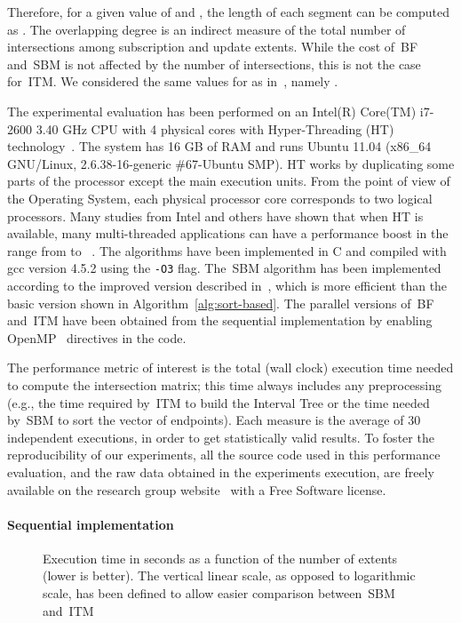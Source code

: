 \documentclass[10pt, conference, compsocconf]{IEEEtran}
\begin{document}
Therefore, for a given value of  and , the length  of
each segment can be computed as . The overlapping
degree is an indirect measure of the total number of intersections
among subscription and update extents. While the cost of~\ac{BF}
and~\ac{SBM} is not affected by the number of intersections, this is not
the case for~\ac{ITM}. We considered the same values for  as
in~\cite{Raczy2005}, namely .

The experimental evaluation has been performed on an Intel(R) Core(TM)
i7-2600 \@ 3.40 GHz CPU with 4 physical cores with Hyper-Threading
(HT) technology~\cite{HT}. The system has 16 GB of RAM and runs Ubuntu
11.04 (x86\_64 GNU/Linux, 2.6.38-16-generic \#67-Ubuntu SMP). HT works
by duplicating some parts of the processor except the main execution
units. From the point of view of the Operating System, each physical
processor core corresponds to two logical processors. Many studies
from Intel and others have shown that when HT is available, many
multi-threaded applications can have a performance boost in the range
from  to ~\cite{HT}.  The algorithms have been implemented
in C and compiled with gcc version 4.5.2 using the \verb+-O3+
flag. The~\ac{SBM} algorithm has been implemented according to the
improved version described in~\cite[Section 4.2]{Raczy2005}, which is
more efficient than the basic version shown in
Algorithm~\ref{alg:sort-based}. The parallel versions of~\ac{BF}
and~\ac{ITM} have been obtained from the sequential implementation by
enabling OpenMP~\cite{openMP} directives in the code.

The performance metric of interest is the total (wall clock) execution
time needed to compute the intersection matrix; this time always
includes any preprocessing (e.g., the time required by~\ac{ITM} to
build the Interval Tree or the time needed by~\ac{SBM} to sort the
vector of endpoints). Each measure is the average of 30 independent
executions, in order to get statistically valid results. To foster the
reproducibility of our experiments, all the source code used in this
performance evaluation, and the raw data obtained in the experiments
execution, are freely available on the research group
website~\cite{pads} with a Free Software license.

\paragraph*{Sequential implementation}

\begin{figure*}[t]
\centering {}
\caption{Execution time in seconds as a function of the number  of
  extents (lower is better). The vertical linear scale, as opposed to
  logarithmic scale, has been defined to allow easier comparison
  between~\ac{SBM} and~\ac{ITM}}\label{fig:sequential_comparison}
\end{figure*}
\end{document}
